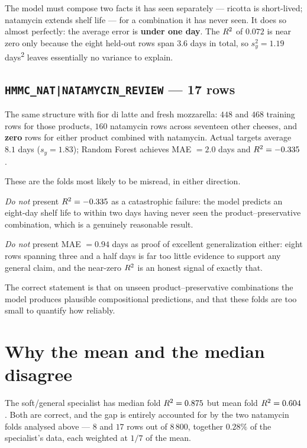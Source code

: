 The model must compose two facts it has seen separately --- ricotta is
short-lived; natamycin extends shelf life --- for a combination it has
never seen. It does so almost perfectly: the average error is
\textbf{under one day}. The $R^2$ of $0.072$ is near zero only because the
eight held-out rows span $3.6$ days in total, so $s_y^2 = 1.19$
days\textsuperscript{2} leaves essentially no variance to explain.

\subsection{\texttt{HMMC\_NAT|NATAMYCIN\_REVIEW} --- 17 rows}

The same structure with fior di latte and fresh mozzarella: $448$ and
$468$ training rows for those products, $160$ natamycin rows across
seventeen other cheeses, and \textbf{zero} rows for either product
combined with natamycin. Actual targets average $8.1$ days
($s_y = 1.83$); Random Forest achieves MAE $= 2.0$ days and
$R^2 = -0.335$.

\begin{findingbox}[title={How to present these two folds}]
These are the folds most likely to be misread, in either direction.

\emph{Do not} present $R^2 = -0.335$ as a catastrophic failure: the model
predicts an eight-day shelf life to within two days having never seen the
product--preservative combination, which is a genuinely reasonable result.

\emph{Do not} present MAE $= 0.94$ days as proof of excellent
generalization either: eight rows spanning three and a half days is far too
little evidence to support any general claim, and the near-zero $R^2$ is
an honest signal of exactly that.

The correct statement is that on unseen product--preservative
combinations the model produces plausible compositional predictions, and
that these folds are too small to quantify how reliably.
\end{findingbox}

\section{Why the mean and the median disagree}

The soft/general specialist has median fold $R^2 = 0.875$ but mean fold
$R^2 = 0.604$. Both are correct, and the gap is entirely accounted for by
the two natamycin folds analysed above --- $8$ and $17$ rows out of
$8\,800$, together $0.28\%$ of the specialist's data, each weighted at
$1/7$ of the mean.

